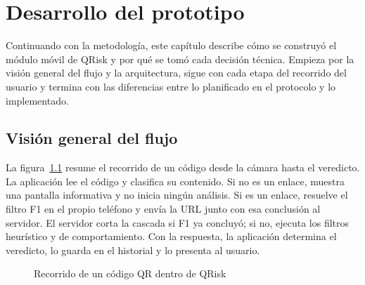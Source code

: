 \chapter{Desarrollo del prototipo}
\label{chap:desarrollo}

Continuando con la metodología, este capítulo describe cómo se construyó el módulo móvil de QRisk y por qué se tomó cada decisión técnica. Empieza por la visión general del flujo y la arquitectura, sigue con cada etapa del recorrido del usuario y termina con las diferencias entre lo planificado en el protocolo y lo implementado.

\section{Visión general del flujo}

La figura~\ref{fig:flujo} resume el recorrido de un código desde la cámara hasta el veredicto. La aplicación lee el código y clasifica su contenido. Si no es un enlace, muestra una pantalla informativa y no inicia ningún análisis. Si es un enlace, resuelve el filtro F1 en el propio teléfono y envía la URL junto con esa conclusión al servidor. El servidor corta la cascada si F1 ya concluyó; si no, ejecuta los filtros heurístico y de comportamiento. Con la respuesta, la aplicación determina el veredicto, lo guarda en el historial y lo presenta al usuario.

\begin{figure}[H]
	\centering
	\caption{Recorrido de un código QR dentro de QRisk}
	\label{fig:flujo}
\end{figure}

